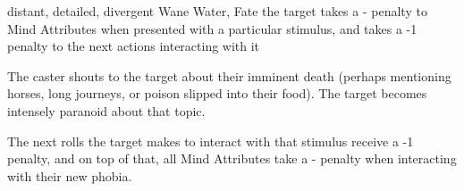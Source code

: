   {distant, detailed, divergent}%
  {Wane}%
  {Water, Fate}%
  {}%
  {the target takes a - penalty to Mind Attributes when presented with a particular stimulus, and takes a -1 penalty to the next  actions interacting with it}%
  {
    The caster shouts to the target about their imminent death (perhaps mentioning horses, long journeys, or poison slipped into their food).
    The target becomes intensely paranoid about that topic.

    The next  rolls the target makes to interact with that stimulus receive a -1 penalty, and on top of that, all Mind Attributes take a - penalty when interacting with their new phobia.
  }
